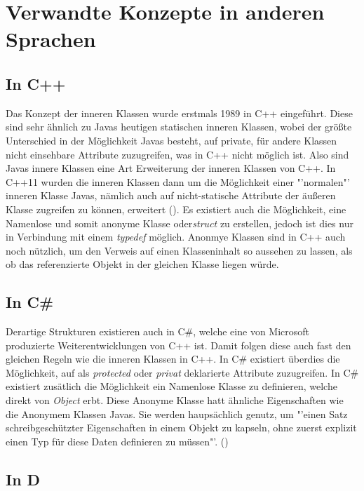 \chapter{Verwandte Konzepte in anderen Sprachen}
\section{In C++}

Das Konzept der inneren Klassen wurde erstmals 1989 in C++ eingeführt.
Diese sind sehr ähnlich zu Javas heutigen statischen inneren Klassen, wobei der größte Unterschied in der Möglichkeit Javas besteht, auf private, für andere Klassen nicht einsehbare Attribute zuzugreifen, was in C++ nicht möglich ist.
Also sind Javas innere Klassen eine Art Erweiterung der inneren Klassen von C++.
In C++11 wurden die inneren Klassen dann um die Möglichkeit einer "'normalen"' inneren Klasse Javas,
 nämlich auch auf nicht-statische Attribute der äußeren Klasse zugreifen zu können, erweitert (\cite{Ellis2007}).
Es existiert auch die Möglichkeit, eine Namenlose und somit anonyme Klasse oder{\it struct} zu erstellen, jedoch ist dies nur in Verbindung mit einem {\it typedef} möglich.
Anonmye Klassen sind in C++ auch noch nützlich, um den Verweis auf einen Klasseninhalt so aussehen zu lassen, als ob das referenzierte Objekt in der gleichen Klasse liegen würde.

\section{In C\#}

Derartige Strukturen existieren auch in C\#, welche eine von Microsoft produzierte Weiterentwicklungen von C++ ist.
Damit folgen diese auch fast den gleichen Regeln wie die inneren Klassen in C++.
In C\# existiert überdies die Möglichkeit, auf als {\it protected} oder {\it privat} deklarierte Attribute zuzugreifen.
In C\# existiert zusätlich die Möglichkeit ein Namenlose Klasse zu definieren, welche direkt von {\it Object} erbt. Diese Anonyme Klasse hatt ähnliche Eigenschaften wie die Anonymem Klassen Javas.
Sie werden haupsächlich genutz, um "'einen Satz schreibgeschützter Eigenschaften in einem Objekt zu kapseln, ohne zuerst explizit einen Typ für diese Daten definieren zu müssen"'. (\cite{Microsoft:Csharp})

\newpage
\section{In D}


